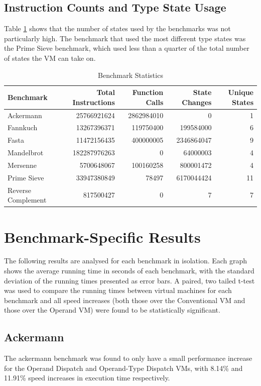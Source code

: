 \documentclass[english,a4paper,12pt]{report}
\begin{document}
\subsection{Instruction Counts and Type State Usage}
Table \ref{tab:stats} shows that the number of states used by the
benchmarks was not particularly high. The benchmark that used the most
different type states was the Prime Sieve benchmark, which used less
than a quarter of the total number of states the VM can take on.

\begin{table}[!htb]
  \centering
  \begin{center}
    \begin{tabular}{lrrrr}
      Benchmark & Total Instructions & Function Calls & State Changes & Unique States\\
      \hline
      Ackermann & 25766921624 & 2862984010 & 0 & 1\\
      Fannkuch & 13267396371 & 119750400 & 199584000 & 6\\
      Fasta & 11472156435 & 400000005 & 2346864047 & 9\\
      Mandelbrot & 182287976263 & 0 & 64000003 & 4\\
      Mersenne & 5700648067 & 100160258 & 800001472 & 4\\
      Prime Sieve & 33947380849 & 78497 & 6170044424 & 11\\
      Reverse Complement & 817500427 & 0 & 7 & 7\\
    \end{tabular}
  \end{center}
  \caption{Benchmark Statistics}
  \label{tab:stats}
\end{table}

\section{Benchmark-Specific Results}

The following results are analysed for each benchmark in
isolation. Each graph shows the average running time in seconds of
each benchmark, with the standard deviation of the running times
presented as error bars. A paired, two tailed t-test was used to
compare the running times between virtual machines for each benchmark
and all speed increases (both those over the Conventional VM and those
over the Operand VM) were found to be statistically significant.

\subsection{Ackermann}
The ackermann benchmark was found to only have a small performance
increase for the Operand Dispatch and Operand-Type Dispatch VMs, with
8.14\% and 11.91\% speed increases in execution time respectively.
\end{document}
